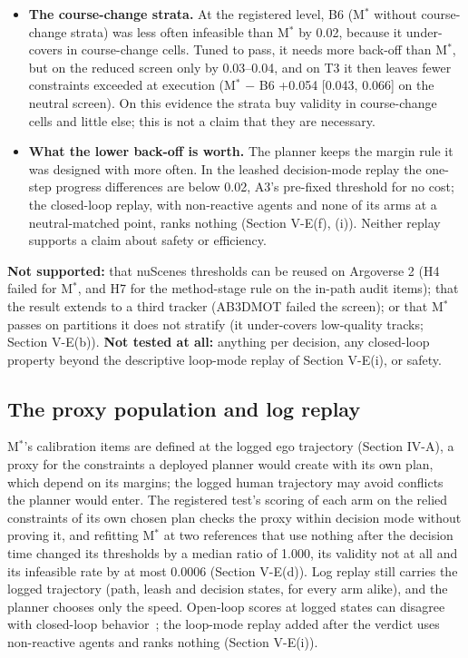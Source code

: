 \documentclass{ieeeaccess}
\begin{document}
\begin{itemize}
\item \textbf{The course-change strata.} At the registered level, B6 (M$^{*}$ without course-change strata) was less often infeasible than M$^{*}$ by 0.02, because it under-covers in course-change cells. Tuned to pass, it needs more back-off than M$^{*}$, but on the reduced screen only by 0.03--0.04, and on T3 it then leaves fewer constraints exceeded at execution (M$^{*}$ $-$ B6 +0.054 [0.043, 0.066] on the neutral screen). On this evidence the strata buy validity in course-change cells and little else; this is not a claim that they are necessary.
\item \textbf{What the lower back-off is worth.} The planner keeps the margin rule it was designed with more often. In the leashed decision-mode replay the one-step progress differences are below 0.02, A3's pre-fixed threshold for no cost; the closed-loop replay, with non-reactive agents and none of its arms at a neutral-matched point, ranks nothing (Section V-E(f), (i)). Neither replay supports a claim about safety or efficiency.
\end{itemize}

\textbf{Not supported:} that nuScenes thresholds can be reused on Argoverse 2 (H4 failed for M$^{*}$, and H7 for the method-stage rule on the in-path audit items); that the result extends to a third tracker (AB3DMOT failed the screen); or that M$^{*}$ passes on partitions it does not stratify (it under-covers low-quality tracks; Section V-E(b)). \textbf{Not tested at all:} anything per decision, any closed-loop property beyond the descriptive loop-mode replay of Section V-E(i), or safety.

\subsection{The proxy population and log replay}
M$^{*}$'s calibration items are defined at the logged ego trajectory (Section IV-A), a proxy for the constraints a deployed planner would create with its own plan, which depend on its margins; the logged human trajectory may avoid conflicts the planner would enter. The registered test's scoring of each arm on the relied constraints of its own chosen plan checks the proxy within decision mode without proving it, and refitting M$^{*}$ at two references that use nothing after the decision time changed its thresholds by a median ratio of 1.000, its validity not at all and its infeasible rate by at most 0.0006 (Section V-E(d)). Log replay still carries the logged trajectory (path, leash and decision states, for every arm alike), and the planner chooses only the speed. Open-loop scores at logged states can disagree with closed-loop behavior~\cite{Dauner2023,Karnchanachari2024}; the loop-mode replay added after the verdict uses non-reactive agents and ranks nothing (Section V-E(i)).
\end{document}
